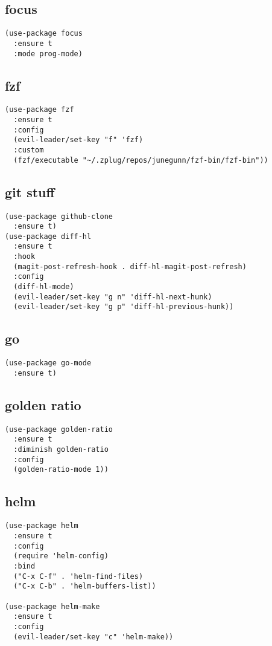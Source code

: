 \documentclass[11pt]{article}
\begin{document}
\subsection{focus}
\label{sec-2-11}
\begin{verbatim}
(use-package focus
  :ensure t
  :mode prog-mode)
\end{verbatim}
\subsection{fzf}
\label{sec-2-12}
\begin{verbatim}
(use-package fzf
  :ensure t 
  :config
  (evil-leader/set-key "f" 'fzf)
  :custom
  (fzf/executable "~/.zplug/repos/junegunn/fzf-bin/fzf-bin"))
\end{verbatim}
\subsection{git stuff}
\label{sec-2-13}
\begin{verbatim}
(use-package github-clone
  :ensure t)
(use-package diff-hl
  :ensure t 
  :hook
  (magit-post-refresh-hook . diff-hl-magit-post-refresh)
  :config
  (diff-hl-mode)
  (evil-leader/set-key "g n" 'diff-hl-next-hunk)
  (evil-leader/set-key "g p" 'diff-hl-previous-hunk))
\end{verbatim}
\subsection{go}
\label{sec-2-14}
\begin{verbatim}
(use-package go-mode
  :ensure t)
\end{verbatim}
\subsection{golden ratio}
\label{sec-2-15}
\begin{verbatim}
(use-package golden-ratio
  :ensure t
  :diminish golden-ratio
  :config
  (golden-ratio-mode 1))
\end{verbatim}
\subsection{helm}
\label{sec-2-16}
\begin{verbatim}
(use-package helm
  :ensure t
  :config
  (require 'helm-config)
  :bind
  ("C-x C-f" . 'helm-find-files)
  ("C-x C-b" . 'helm-buffers-list)) 

(use-package helm-make
  :ensure t
  :config
  (evil-leader/set-key "c" 'helm-make))
\end{verbatim}
\end{document}
